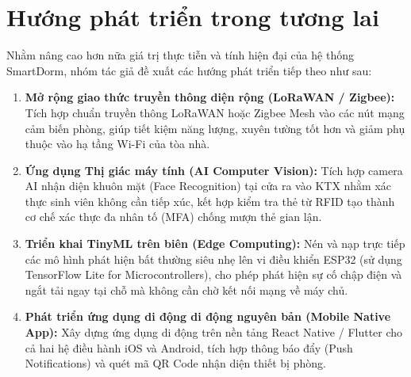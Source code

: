 \section{Hướng phát triển trong tương lai}
\label{sec:huong_phat_trien}

Nhằm nâng cao hơn nữa giá trị thực tiễn và tính hiện đại của hệ thống SmartDorm, nhóm tác giả đề xuất các hướng phát triển tiếp theo như sau:
\begin{enumerate}
    \item \textbf{Mở rộng giao thức truyền thông diện rộng (LoRaWAN / Zigbee):} Tích hợp chuẩn truyền thông LoRaWAN hoặc Zigbee Mesh vào các nút mạng cảm biến phòng, giúp tiết kiệm năng lượng, xuyên tường tốt hơn và giảm phụ thuộc vào hạ tầng Wi-Fi của tòa nhà.
    \item \textbf{Ứng dụng Thị giác máy tính (AI Computer Vision):} Tích hợp camera AI nhận diện khuôn mặt (Face Recognition) tại cửa ra vào KTX nhằm xác thực sinh viên không cần tiếp xúc, kết hợp kiểm tra thẻ từ RFID tạo thành cơ chế xác thực đa nhân tố (MFA) chống mượn thẻ gian lận.
    \item \textbf{Triển khai TinyML trên biên (Edge Computing):} Nén và nạp trực tiếp các mô hình phát hiện bất thường siêu nhẹ lên vi điều khiển ESP32 (sử dụng TensorFlow Lite for Microcontrollers), cho phép phát hiện sự cố chập điện và ngắt tải ngay tại chỗ mà không cần chờ kết nối mạng về máy chủ.
    \item \textbf{Phát triển ứng dụng di động di động nguyên bản (Mobile Native App):} Xây dựng ứng dụng di động trên nền tảng React Native / Flutter cho cả hai hệ điều hành iOS và Android, tích hợp thông báo đẩy (Push Notifications) và quét mã QR Code nhận diện thiết bị phòng.
\end{enumerate}
\newpage
